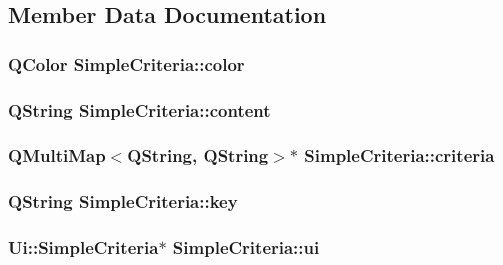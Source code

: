 \subsection{Member Data Documentation}
\hypertarget{class_simple_criteria_a667ee7796b15fbdc8ce75b3b4e29cf79}{
\subsubsection[{color}]{\setlength{\rightskip}{0pt plus 5cm}Q\+Color Simple\+Criteria\+::color\hspace{0.3cm}{\ttfamily [private]}}}\label{class_simple_criteria_a667ee7796b15fbdc8ce75b3b4e29cf79}
\hypertarget{class_simple_criteria_a5cf96300cd20625404d845f6a4ef35a6}{
\subsubsection[{content}]{\setlength{\rightskip}{0pt plus 5cm}Q\+String Simple\+Criteria\+::content\hspace{0.3cm}{\ttfamily [private]}}}\label{class_simple_criteria_a5cf96300cd20625404d845f6a4ef35a6}
\hypertarget{class_simple_criteria_a1faf01cc62a91685e2b7da2a07169708}{
\subsubsection[{criteria}]{\setlength{\rightskip}{0pt plus 5cm}Q\+Multi\+Map$<$Q\+String, Q\+String$>$$\ast$ Simple\+Criteria\+::criteria\hspace{0.3cm}{\ttfamily [private]}}}\label{class_simple_criteria_a1faf01cc62a91685e2b7da2a07169708}
\hypertarget{class_simple_criteria_a1afc125b9086d8d56a065dd99a09876f}{
\subsubsection[{key}]{\setlength{\rightskip}{0pt plus 5cm}Q\+String Simple\+Criteria\+::key\hspace{0.3cm}{\ttfamily [private]}}}\label{class_simple_criteria_a1afc125b9086d8d56a065dd99a09876f}
\hypertarget{class_simple_criteria_a0ab7c643ac34ad4c3bfc9a2e2bc24798}{
\subsubsection[{ui}]{\setlength{\rightskip}{0pt plus 5cm}Ui\+::\+Simple\+Criteria$\ast$ Simple\+Criteria\+::ui\hspace{0.3cm}{\ttfamily [private]}}}\label{class_simple_criteria_a0ab7c643ac34ad4c3bfc9a2e2bc24798}


